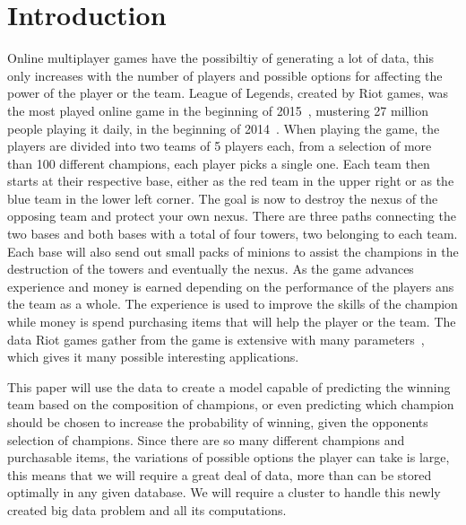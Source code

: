 \section{Introduction}\label{sec:intro}

Online multiplayer games have the possibiltiy of generating a lot of data, this only increases with the number of players and possible options for affecting the power of the player or the team. 
League of Legends, created by Riot games, was the most played online game in the beginning of 2015~\cite{LoLmostplayed}, mustering 27 million people playing it daily, in the beginning of 2014~\cite{LoL27mill}. 
When playing the game, the players are divided into two teams of 5 players each, from a selection of more than 100 different champions, each player picks a single one. 
Each team then starts at their respective base, either as the red team in the upper right or as the blue team in the lower left corner. The goal is now to destroy the nexus of the opposing team and protect your own nexus. There are three paths connecting the two bases and both bases with a total of four towers, two belonging to each team. Each base will also send out small packs of minions to assist the champions in the destruction of the towers and eventually the nexus.
As the game advances experience and money is earned depending on the performance of the players ans the team as a whole. The experience is used to improve the skills of the champion while money is spend purchasing items that will help the player or the team. 
The data Riot games gather from the game is extensive with many parameters~\cite{LoLparameters}, which gives it many possible interesting applications. 

This paper will use the data to create a model capable of predicting the winning team based on the composition of champions, or even predicting which champion should be chosen to increase the probability of winning, given the opponents selection of champions. Since there are so many different champions and purchasable items, the variations of possible options the player can take is large, this means that we will require a great deal of data, more than can be stored optimally in any given database. We will require a cluster to handle this newly created big data problem and all its computations.


